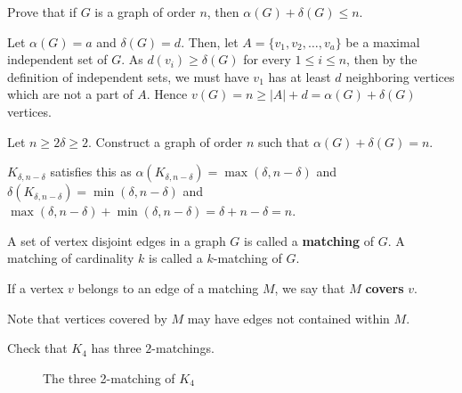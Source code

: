 \begin{problem}
	Prove that if $G$ is a graph of order $n$, then $\alpha \left( G \right) + \delta \left( G \right)  \le n$.
\end{problem}
\begin{solution}
	Let $\alpha \left( G \right) = a$ and $\delta \left( G \right) = d$. Then, let $A =  \{v_1, v_2, \ldots, v_{a}\} $ be a maximal independent set of $G$. As  $d\left( v_{i} \right) \ge \delta \left( G \right)  $ for every $1 \le i \le n$, then by the definition of independent sets, we must have $v_1$ has at least $d$ neighboring vertices which are not a part of $A$. Hence $v\left( G \right) = n \ge   \left| A \right|  + d = \alpha \left( G \right) + \delta \left( G \right) $ vertices.
\end{solution}
\begin{problem}
	Let $n \ge 2 \delta \ge 2$. Construct a graph of order $n$ such that $\alpha \left( G \right)  + \delta \left( G \right)  = n$.
\end{problem}
\begin{solution}
	$K_{\delta, n- \delta}$ satisfies this as $\alpha \left( K_{\delta, n-\delta} \right) = \max\left( \delta, n- \delta \right) $ and $\delta \left( K_{\delta, n- \delta} \right) = \min \left( \delta, n-\delta \right) $ and $\max\left( \delta, n- \delta \right)  + \min \left( \delta, n-\delta \right) = \delta + n-\delta = n$.
\end{solution}
\begin{definition}[Matching]
	A set of vertex disjoint edges in a graph $G$ is called a \textbf{matching} of $G$. A matching of cardinality $k$ is called a $k$-matching of $G$.
\end{definition}
\begin{definition}[Covering]
	If a vertex $v$ belongs to an edge of a matching $M$, we say that $M$ \textbf{covers} $v$.
\end{definition}
\begin{remark}
Note that vertices covered by $M$ may have edges not contained within $M$.
\end{remark}
 \begin{problem}
	Check that $K_4$ has three $2$-matchings.
\end{problem}
\begin{solution}
\begin{figure}[ht]
    \centering
    \caption{The three 2-matching of $K_4$}
    \label{fig:matchingprob}
\end{figure}
\end{solution}
